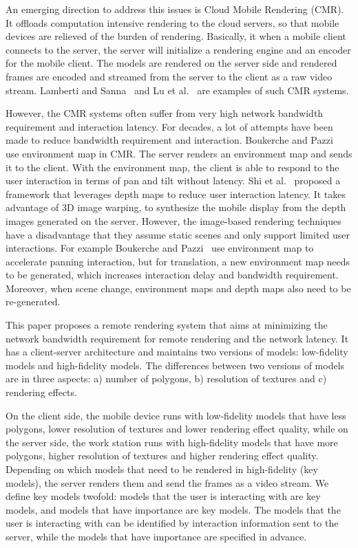 An emerging direction to address this issues is Cloud Mobile Rendering (CMR).
It offloads computation intensive rendering to the cloud servers, so that mobile devices are relieved of the burden of rendering.
Basically, it when a mobile client connects to the server, the server will initialize a rendering engine and an encoder for the mobile client. The models are rendered on the server side and rendered frames are encoded and streamed from the server to the client as a raw video stream.
Lamberti and Sanna~\cite{lamberti2007} and Lu et al.~\cite{lu2011} are examples of such CMR systems.

However, the CMR systems often suffer from very high network bandwidth requirement and interaction latency.
For decades, a lot of attempts have been made to reduce bandwidth requirement and interaction.
Boukerche and Pazzi~\cite{boukerche2006} use environment map in CMR. The server renders an environment map and sends it to the client. With the environment map, the client is able to respond to the user interaction in terms of pan and tilt without latency.
Shi et al.~\cite{shi2012} proposed a framework that leverages depth maps to reduce user interaction latency. It takes advantage of 3D image warping, to synthesize the mobile display from the depth images generated on the server.
However, the image-based rendering techniques have a disadvantage that they assume static scenes and only support limited user interactions.
For example Boukerche and Pazzi~\cite{boukerche2006} use environment map to accelerate panning interaction, but for translation, a new environment map needs to be generated, which increases interaction delay and bandwidth requirement.
Moreover, when scene change, environment maps and depth maps also need to be re-generated.

This paper proposes a remote rendering system that aims at minimizing the network bandwidth requirement for remote rendering and the network latency.
It has a client-server architecture and maintains two versions of models: low-fidelity models and high-fidelity models.
The differences between two versions of models are in three aspects: a) number of polygons, b) resolution of textures and c) rendering effects.

On the client side, the mobile device runs with low-fidelity models that have less polygons, lower resolution of textures and lower rendering effect quality, while on the server side, the work station runs with high-fidelity models that have more polygons, higher resolution of textures and higher rendering effect quality. Depending on which models that need to be rendered in high-fidelity (key models), the server renders them and send the frames as a video stream. We define key models twofold: models that the user is interacting with are key models, and models that have importance are key models. The models that the user is interacting with can be identified by interaction information sent to the server, while the models that have importance are specified in advance.

